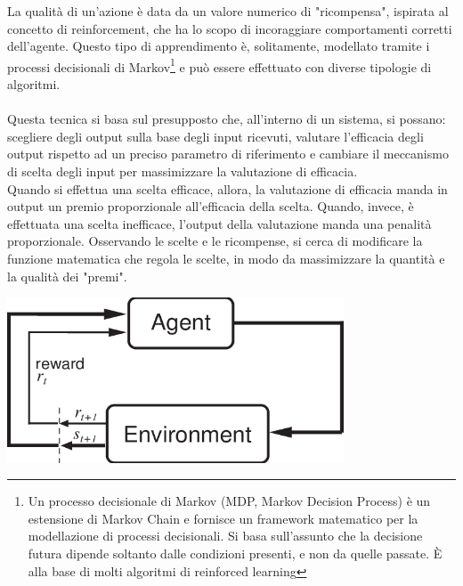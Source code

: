 \documentclass[a4paper,12pt]{report}
\begin{document}
\begin{fig}
La qualità di un'azione è data da un valore numerico di "ricompensa", ispirata al concetto di reinforcement, che ha lo scopo di incoraggiare comportamenti corretti dell'agente. Questo tipo di apprendimento è, solitamente, modellato tramite i processi decisionali di Markov\footnote{Un processo decisionale di Markov (MDP, Markov Decision Process) è un estensione di Markov Chain e fornisce un framework matematico per la modellazione di processi decisionali. Si basa sull'assunto che la decisione futura dipende soltanto dalle condizioni presenti, e non da quelle passate. È alla base di molti algoritmi di reinforced learning} e può essere effettuato con diverse tipologie di algoritmi.\\~\\
Questa tecnica si basa sul presupposto che, all'interno di un sistema, si possano: scegliere degli output sulla base degli input ricevuti, valutare l'efficacia degli output rispetto ad un preciso parametro di riferimento e cambiare il meccanismo di scelta degli input per massimizzare la valutazione di efficacia.\\
Quando si effettua una scelta efficace, allora, la valutazione di efficacia manda in output un premio proporzionale all'efficacia della scelta. Quando, invece, è effettuata una scelta inefficace, l'output della valutazione manda una penalità proporzionale. Osservando le scelte e le ricompense, si cerca di modificare la funzione matematica che regola le scelte, in modo da massimizzare la quantità e la qualità dei "premi".\\

\begin{fig}
	\begin{center}
			\includegraphics[width=10cm]{rl}
	\end{center}
	\label{Figura 16}
\end{fig}


\end{fig}
\end{document}
